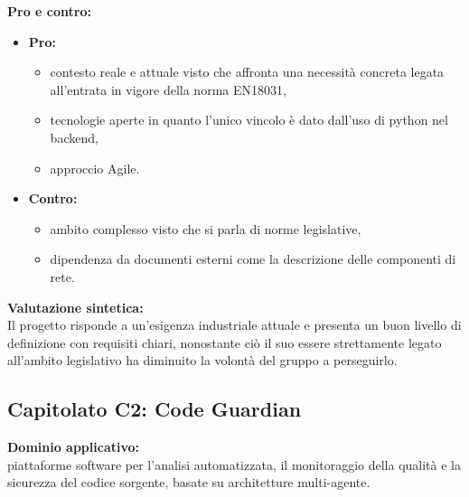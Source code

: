 \vspace{0.3cm}
\textbf{Pro e contro:}
\begin{itemize}
	\item \textbf{Pro:}
        \begin{itemize}
            \item contesto reale e attuale visto che affronta una necessità concreta legata all'entrata in vigore della norma EN18031,
            \item tecnologie aperte in quanto l'unico vincolo è dato dall'uso di python nel backend,
            \item approccio Agile. 
        \end{itemize}
	\item \textbf{Contro:} 
        \begin{itemize}
            \item ambito complesso visto che si parla di norme legislative,
            \item dipendenza da documenti esterni come la descrizione delle componenti di rete.
        \end{itemize}
\end{itemize}

\vspace{0.3cm}
\textbf{Valutazione sintetica:} \\
Il progetto risponde a un'esigenza industriale attuale e presenta un buon livello di definizione con requisiti chiari, nonostante ciò il suo
essere strettamente legato all'ambito legislativo ha diminuito la volontà del gruppo a perseguirlo.

\vspace{0.5cm}

\vspace{0.5cm}

\subsection{Capitolato C2: {Code Guardian} }

\textbf{Dominio applicativo:} \\
{piattaforme software per l’analisi automatizzata, il monitoraggio della qualità e la sicurezza del codice sorgente, basate su architetture multi-agente.}

